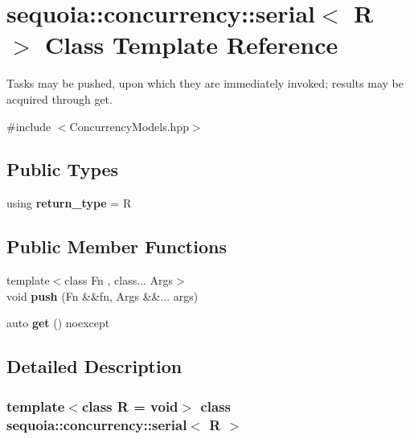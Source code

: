 \hypertarget{classsequoia_1_1concurrency_1_1serial}{}\section{sequoia\+::concurrency\+::serial$<$ R $>$ Class Template Reference}
\label{classsequoia_1_1concurrency_1_1serial}


Tasks may be pushed, upon which they are immediately invoked; results may be acquired through get.  




{\ttfamily \#include $<$Concurrency\+Models.\+hpp$>$}

\subsection*{Public Types}
\begin{DoxyCompactItemize}
\item 
\mbox{\label{classsequoia_1_1concurrency_1_1serial_a4780c75d1acc4dd892be0d72888e394e}} 
using {\bfseries return\+\_\+type} = R
\end{DoxyCompactItemize}
\subsection*{Public Member Functions}
\begin{DoxyCompactItemize}
\item 
\mbox{\label{classsequoia_1_1concurrency_1_1serial_a47f629d9427cedc86b5ab874611ba187}} 
{\footnotesize template$<$class Fn , class... Args$>$ }\\void {\bfseries push} (Fn \&\&fn, Args \&\&... args)
\item 
\mbox{\label{classsequoia_1_1concurrency_1_1serial_ad6730b75f609757953234301b528d2df}} 
auto {\bfseries get} () noexcept
\end{DoxyCompactItemize}


\subsection{Detailed Description}
\subsubsection*{template$<$class R = void$>$\newline
class sequoia\+::concurrency\+::serial$<$ R $>$}

